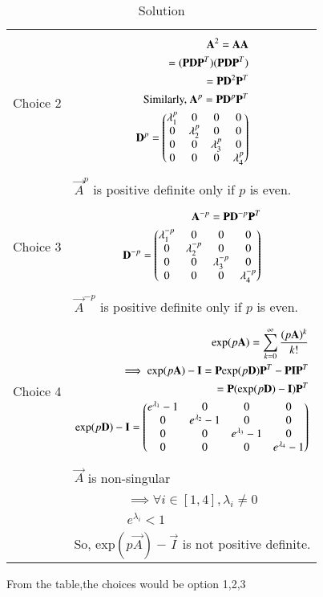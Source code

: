 \begin{table*}[!t]
\begin{tabular}{|l|l|}
      \hline
      Choice 2 & 
       \parbox{12cm}{\begin{align}
          \mathbf{A}^2=\mathbf{A}\mathbf{A}\\
    =(\mathbf{P}\mathbf{D}\mathbf{P}^T)(\mathbf{P}\mathbf{D}\mathbf{P}^T)\\
    =\mathbf{P}\mathbf{D}^2\mathbf{P}^T\\
    \text{Similarly, }\mathbf{A}^p=\mathbf{P}\mathbf{D}^p\mathbf{P}^T\\
    \mathbf{D}^p=\begin{pmatrix}\lambda_1^p&0&0&0\\0&\lambda_2^p&0&0\\0&0&\lambda_3^p&0\\0&0&0&\lambda_4^p\end{pmatrix}
       \end{align}}\\
       & $\vec{A}^{p}$ is positive definite only if $p$ is even.\\
       \hline
      Choice 3& 
        \parbox{12cm}{\begin{align}
           \mathbf{A}^{-p}=\mathbf{P}\mathbf{D}^{-p}\mathbf{P}^T\\
    \mathbf{D}^{-p}=\begin{pmatrix}\lambda_1^{-p}&0&0&0\\0&\lambda_2^{-p}&0&0\\0&0&\lambda_3^{-p}&0\\0&0&0&\lambda_4^{-p}\end{pmatrix}
       \end{align}}\\
       & $\vec{A}^{-p}$ is positive definite only if $p$ is even.\\
       \hline
      Choice 4 &
        \parbox{12cm}{\begin{align}
          \text{exp}(p\mathbf{A})=\sum_{k=0}^\infty \frac{(p\mathbf{A})^k}{k!}\\
     \implies  \text{exp}(p\mathbf{A})-\mathbf{I}=\mathbf{P} \text{exp}(p\mathbf{D})\mathbf{P}^T-\mathbf{P}\mathbf{I}\mathbf{P}^T\\
     =\mathbf{P}( \text{exp}(p\mathbf{D})-\mathbf{I}) \mathbf{P}^T\\
     \text{exp}(p\mathbf{D})-\mathbf{I}=\begin{pmatrix}e^{\lambda_1}-1&0&0&0\\0&e^{\lambda_2}-1&0&0\\0&0&e^{\lambda_3}-1&0\\0&0&0&e^{\lambda_4}-1\end{pmatrix}
       \end{align}}\\
       & $\vec{A}$ is non-singular\\
        & \parbox{12cm}{\begin{align}
   \implies \forall i \in [1,4], \lambda_i\neq0\\
   e^{\lambda_i}<1
\end{align}}\\
 & So, exp$(p\vec{A})-\vec{I}$ is not positive definite.\\
       \hline
    \end{tabular}
    \caption{Solution}
\label{eq:solutions/2017/dec/77/table:0}
\end{table*}
 From the table,the choices would be option 1,2,3




